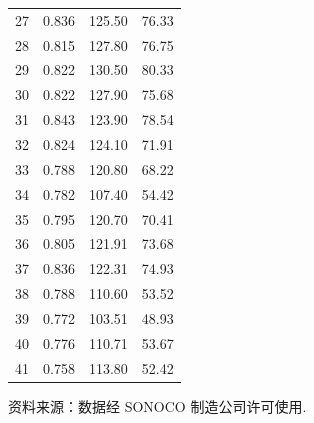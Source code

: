 \begin{mvtable}
\begin{longtable}{cccc}
27 & 0.836 & 125.50 & 76.33 \\
28 & 0.815 & 127.80 & 76.75 \\
29 & 0.822 & 130.50 & 80.33 \\
30 & 0.822 & 127.90 & 75.68 \\
31 & 0.843 & 123.90 & 78.54 \\
32 & 0.824 & 124.10 & 71.91 \\
33 & 0.788 & 120.80 & 68.22 \\
34 & 0.782 & 107.40 & 54.42 \\
35 & 0.795 & 120.70 & 70.41 \\
36 & 0.805 & 121.91 & 73.68 \\
37 & 0.836 & 122.31 & 74.93 \\
38 & 0.788 & 110.60 & 53.52 \\
39 & 0.772 & 103.51 & 48.93 \\
40 & 0.776 & 110.71 & 53.67 \\
41 & 0.758 & 113.80 & 52.42 \\
\end{longtable}
\label{tab:1.2}
\end{mvtable}

{ 资料来源：数据经 SONOCO 制造公司许可使用.}

